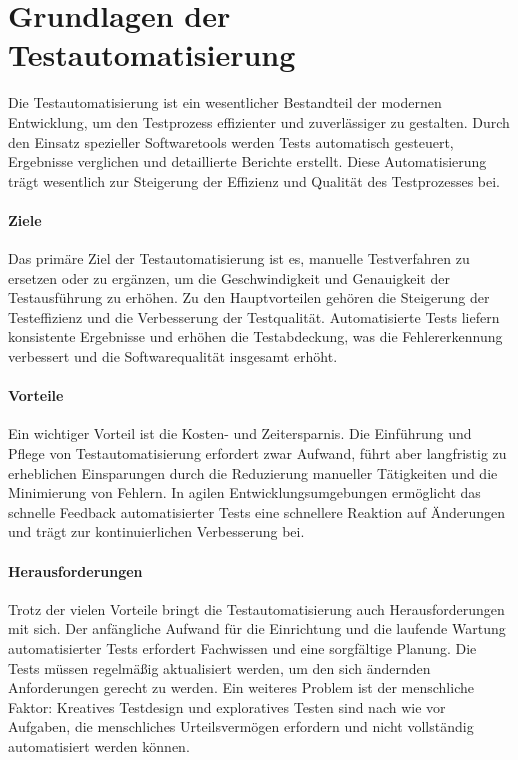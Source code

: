 \section{Grundlagen der Testautomatisierung}

Die Testautomatisierung ist ein wesentlicher Bestandteil der modernen Entwicklung, um den Testprozess effizienter und zuverlässiger zu gestalten. Durch den Einsatz spezieller Softwaretools werden Tests automatisch gesteuert, Ergebnisse verglichen und detaillierte Berichte erstellt. Diese Automatisierung trägt wesentlich zur Steigerung der Effizienz und Qualität des Testprozesses bei.

\paragraph{Ziele}

Das primäre Ziel der Testautomatisierung ist es, manuelle Testverfahren zu ersetzen oder zu ergänzen, um die Geschwindigkeit und Genauigkeit der Testausführung zu erhöhen. 
Zu den Hauptvorteilen gehören die Steigerung der Testeffizienz und die Verbesserung der Testqualität. Automatisierte Tests liefern konsistente Ergebnisse und erhöhen die 
Testabdeckung, was die Fehlererkennung verbessert und die Softwarequalität insgesamt erhöht.

\paragraph{Vorteile}

Ein wichtiger Vorteil ist die Kosten- und Zeitersparnis. Die Einführung und Pflege von Testautomatisierung erfordert zwar Aufwand, führt aber langfristig zu erheblichen Einsparungen 
durch die Reduzierung manueller Tätigkeiten und die Minimierung von Fehlern. In agilen Entwicklungsumgebungen ermöglicht das schnelle Feedback automatisierter Tests eine schnellere 
Reaktion auf Änderungen und trägt zur kontinuierlichen Verbesserung bei.

\paragraph{Herausforderungen}

Trotz der vielen Vorteile bringt die Testautomatisierung auch Herausforderungen mit sich. Der anfängliche Aufwand für die Einrichtung und die laufende Wartung automatisierter Tests 
erfordert Fachwissen und eine sorgfältige Planung. Die Tests müssen regelmäßig aktualisiert werden, um den sich ändernden Anforderungen gerecht zu werden. Ein weiteres Problem ist 
der menschliche Faktor: Kreatives Testdesign und exploratives Testen sind nach wie vor Aufgaben, die menschliches Urteilsvermögen erfordern und nicht vollständig automatisiert werden 
können.

